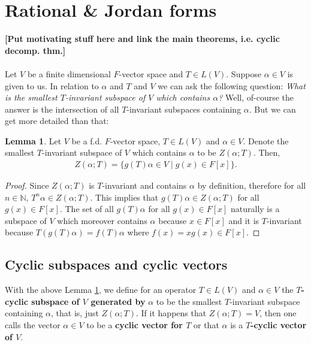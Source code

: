 \documentclass[letterpaper,11pt,twoside]{article}
\theoremstyle{definition}
\theoremstyle{definition}
\theoremstyle{definition}
\theoremstyle{definition}
\newtheorem{lemma}[proposition]{\textbf{Lemma}}
\theoremstyle{definition}
\theoremstyle{definition}
\theoremstyle{remark}
\theoremstyle{definition}
\begin{document}
    \section{Rational \& Jordan forms}
    \textbf{[Put motivating stuff here and link the main theorems, i.e. cyclic decomp. thm.]}\\\\
    
    Let $V$ be a finite dimensional $F$-vector space and $T\in L(V)$. Suppose $\alpha \in V$ is given to us. In relation to $\alpha$ and $T$ and $V$ we can ask the following question: \textit{What is the smallest $T$-invariant subspace of $V$ which contains $\alpha$?} Well, of-course the answer is the intersection of all $T$-invariant subspaces containing $\alpha$. But we can get more detailed than that:
    \begin{lemma}\label{L-3.0.1}
    Let $V$ be a f.d. $F$-vector space, $T\in L(V)$ and $\alpha \in V$. Denote the smallest $T$-invariant subspace of $V$ which contains $\alpha$ to be $Z(\alpha;T)$. Then, 
    \begin{align*}
        Z(\alpha; T)= \{g(T)\alpha\in V\;\vert\; g(x) \in F[x]\}.
    \end{align*}
    \end{lemma}
    \begin{proof}
    Since $Z(\alpha;T)$ is $T$-invariant and contains $\alpha$ by definition, therefore for all $n\in \mathbb{N}$, $T^n\alpha \in Z(\alpha;T)$. This implies that $g(T)\alpha \in Z(\alpha;T)$ for all $g(x)\in F[x]$. The set of all $g(T)\alpha $ for all $g(x) \in F[x]$ naturally is a subspace of $V$ which moreover contains $\alpha$ because $x\in F[x]$ and it is $T$-invariant because $T(g(T)\alpha) = f(T)\alpha$ where $f(x) = xg(x)\in F[x]$.
    \end{proof}
    \subsection{Cyclic subspaces and cyclic vectors}\label{S-3.1}
    With the above Lemma \ref{L-3.0.1}, we define for an operator $T\in L(V)$ and $\alpha\in V$ the $T$\textbf{-cyclic subspace of $V$ generated by} $\alpha$ to be the smallest $T$-invariant subspace containing $\alpha$, that is, just $Z(\alpha;T)$. If it happens that $Z(\alpha;T) = V$, then one calls the vector $\alpha \in V$ to be a \textbf{cyclic vector for $T$} or that $ \alpha $ is a \textbf{$ T $-cyclic vector of $ V $}.\\
    
\end{document}
